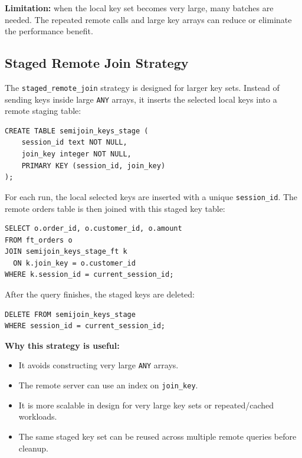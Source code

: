 \documentclass[10pt,a4paper]{article}
\begin{document}
\textbf{Limitation:} when the local key set becomes very large, many batches are needed. The repeated remote calls and large key arrays can reduce or eliminate the performance benefit.

\subsection{Staged Remote Join Strategy}

The \texttt{staged\_remote\_join} strategy is designed for larger key sets. Instead of sending keys inside large \texttt{ANY} arrays, it inserts the selected local keys into a remote staging table:

\begin{lstlisting}[style=sqlstyle]
CREATE TABLE semijoin_keys_stage (
    session_id text NOT NULL,
    join_key integer NOT NULL,
    PRIMARY KEY (session_id, join_key)
);
\end{lstlisting}

For each run, the local selected keys are inserted with a unique \texttt{session\_id}. The remote orders table is then joined with this staged key table:

\begin{lstlisting}[style=sqlstyle]
SELECT o.order_id, o.customer_id, o.amount
FROM ft_orders o
JOIN semijoin_keys_stage_ft k
  ON k.join_key = o.customer_id
WHERE k.session_id = current_session_id;
\end{lstlisting}

After the query finishes, the staged keys are deleted:

\begin{lstlisting}[style=sqlstyle]
DELETE FROM semijoin_keys_stage
WHERE session_id = current_session_id;
\end{lstlisting}

\textbf{Why this strategy is useful:}

\begin{itemize}
    \item It avoids constructing very large \texttt{ANY} arrays.
    \item The remote server can use an index on \texttt{join\_key}.
    \item It is more scalable in design for very large key sets or repeated/cached workloads.
    \item The same staged key set can be reused across multiple remote queries before cleanup.
\end{itemize}
\end{document}

